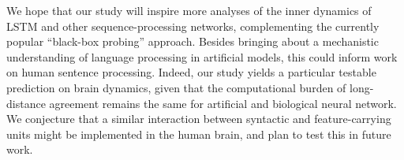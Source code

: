 We hope that our study will inspire more analyses of the inner dynamics of LSTM and other sequence-processing networks, complementing the currently popular ``black-box probing'' approach. Besides bringing about a mechanistic understanding of language processing in artificial models, this could inform work on human sentence processing.  Indeed, our study yields a particular testable prediction on brain dynamics, given that the computational burden of long-distance agreement remains the same for artificial and biological neural network. We conjecture that a similar interaction between syntactic and feature-carrying units might be implemented in the human brain, and plan to test this in future work.





